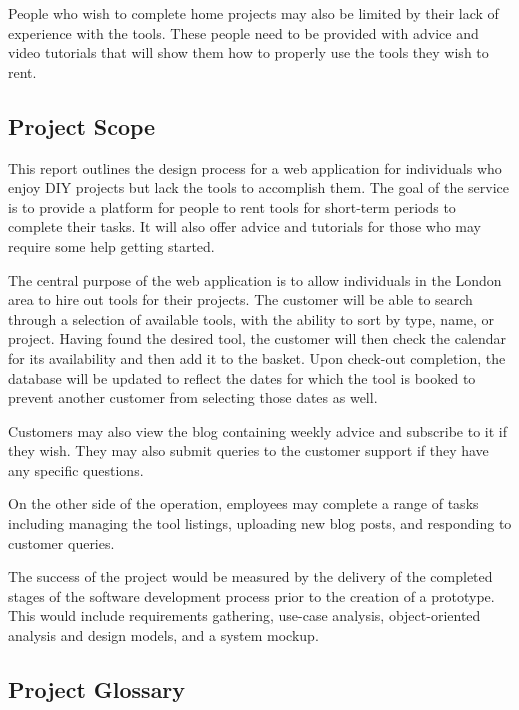 \documentclass[fontsize=11pt]{extarticle}
\numberwithin{figure}{section} %
\numberwithin{table}{section}%
\begin{document}
People who wish to complete home projects may also be limited by their
lack of experience with the tools. These people need to be provided with
advice and video tutorials that will show them how to properly use the
tools they wish to rent.

\hypertarget{project-scope}{%
\subsection{Project Scope}\label{project-scope}}

This report outlines the design process for a web application for
individuals who enjoy DIY projects but lack the tools to accomplish
them. The goal of the service is to provide a platform for people to
rent tools for short-term periods to complete their tasks. It will also
offer advice and tutorials for those who may require some help getting
started.

The central purpose of the web application is to allow individuals in
the London area to hire out tools for their projects. The customer will
be able to search through a selection of available tools, with the
ability to sort by type, name, or project. Having found the desired
tool, the customer will then check the calendar for its availability and
then add it to the basket. Upon check-out completion, the database will
be updated to reflect the dates for which the tool is booked to prevent
another customer from selecting those dates as well.

Customers may also view the blog containing weekly advice and subscribe
to it if they wish. They may also submit queries to the customer support
if they have any specific questions.

On the other side of the operation, employees may complete a range of
tasks including managing the tool listings, uploading new blog posts,
and responding to customer queries.

The success of the project would be measured by the delivery of the
completed stages of the software development process prior to the
creation of a prototype. This would include requirements gathering,
use-case analysis, object-oriented analysis and design models, and a
system mockup.

\hypertarget{project-glossary}{%
\subsection{Project Glossary}\label{project-glossary}}
\end{document}
